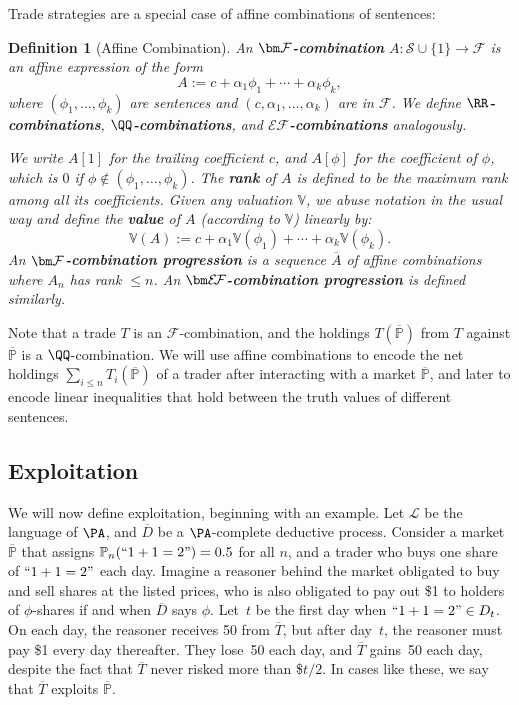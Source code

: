 \documentclass[authordate,onecolumn,noenvironments]{miri-tech-article}
\newtheorem{definition}[theorem]{Definition}
\numberwithin{equation}{subsection}
\newcommand{\quot}[1]{``#1"}
\newcommand{\seq}[1]{{\overline{#1}}}
\newcommand{\affconst}{c}
\newcommand{\fconst}{1}
\newcommand{\nn}{n}
\newcommand{\feature}{\alpha} %
\newcommand{\features}{\mathcal{F}} %
\newcommand{\exfeatures}{\mathcal{E\!F}} %
\newcommand{\aff}{A}
\newcommand{\trade}{T}%
\newcommand{\Trader}{\seq{\trade}} %
\newcommand{\BelState}{\mathbb{P}}
\newcommand{\Valuation}{\mathbb{V}}
\newcommand{\pt}{\BelState}
\newcommand{\MP}{\seq{\pt}}
\newcommand{\ftn}{(\MP)} %
\newcommand{\dt}{D}
\newcommand{\DP}{\seq{\dt}}
\newcommand{\Lang}{\mathcal{L}}
\newcommand{\Sentences}{\mathcal{S}}
\begin{document}
Trade strategies are a special case of affine combinations of sentences:

\begin{definition}[Affine Combination]\label{def:affcomsen}
  An \textbf{$\bm\features$-combination} $\aff : \Sentences \cup \{1\} \to \features$ is an affine expression of the form
  \[
    \aff := \affconst + \feature_1\phi_1 + \cdots + \feature_k\phi_k,
  \]
  where $(\phi_1,\ldots,\phi_k)$ are sentences and $(\affconst, \feature_1, \ldots, \feature_k)$ are in $\features$. We define \textbf{$\RR$-combinations}, \textbf{$\QQ$-combinations}, and \textbf{$\bm{\exfeatures}$-combinations} analogously.
 
  We write $\aff[\fconst]$ for the trailing coefficient $\affconst$, and $\aff[\phi]$ for the coefficient of $\phi$, which is $0$ if $\phi \not\in (\phi_1, \ldots, \phi_k)$. The \textbf{rank} of $\aff$ is defined to be the maximum rank among all its coefficients.  Given any valuation $\Valuation$, we abuse notation in the usual way and define the \textbf{value} of $\aff$ (according to $\Valuation$) linearly by:
  \[
    \Valuation(\aff) := \affconst + \feature_1\Valuation(\phi_1) + \cdots + \feature_k\Valuation(\phi_k).
  \]
  An \textbf{$\bm\features$-combination progression} is a sequence $\seq\aff$ of affine combinations where $\aff_\nn$ has rank $\le n$. An \textbf{$\bm\exfeatures$-combination progression} is defined similarly.
\end{definition}

\noindent Note that a trade $\trade$ is an $\features$-combination, and the holdings $\trade \ftn$ from $\trade$ against $\MP$ is a $\QQ$-combination. We will use affine combinations to encode the net holdings $\sum_{i\leq n}\trade_i(\MP)$ of a trader after interacting with a market $\MP$, and later to encode linear inequalities that hold between the truth values of different sentences. 



\subsection{Exploitation}\label{sec:exploitation}

We will now define exploitation, beginning with an example. Let $\Lang$ be the language of $\PA$, and $\DP$ be a $\PA$-complete deductive process. Consider a market $\MP$ that assigns $\pt_\nn(\quot{1+1=2})=0.5$ for all $\nn$, and a trader who buys one share of $\quot{1+1=2}$ each day. Imagine a reasoner behind the market obligated to buy and sell shares at the listed prices, who is also obligated to pay out \$1 to holders of $\phi$-shares if and when $\DP$ says $\phi$. Let~$t$ be the first day when $\quot{1+1=2}\in\dt_t$. On each day, the reasoner receives 50\textcent{} from $\Trader$, but after day~$t$, the reasoner must pay \$1 every day thereafter. They lose~50\textcent{} each day, and $\Trader$ gains~50\textcent{} each day, despite the fact that $\Trader$ never risked more than \$$t/2$. In cases like these, we say that $\Trader$ exploits $\MP$.
\end{document}
